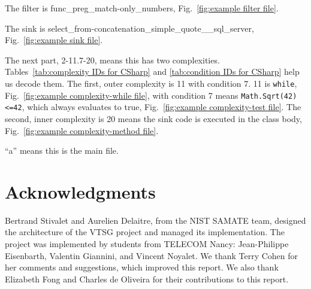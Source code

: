 \documentclass[12pt]{article}
\begin{document}
\noindent The filter is func\_preg\_match-only\_numbers,
Fig.~\ref{fig:example filter file}.

\noindent The sink is select\_from-concatenation\_simple\_quote\_\_sql\_server,
Fig.~\ref{fig:example sink file}.

\noindent The next part, 2-11.7-20, means this has two complexities.
Tables~\ref{tab:complexity IDs for CSharp} and
\ref{tab:condition IDs for CSharp} help us decode them.
The first, outer complexity is 11 with condition 7. 11 is \verb|while|,
Fig.~\ref{fig:example complexity-while file}, 
with condition 7 means \verb|Math.Sqrt(42)<=42|, which always evaluates to true,
Fig.~\ref{fig:example complexity-test file}.
The second, inner complexity is 20 means the sink code is executed in the class body,
Fig.~\ref{fig:example complexity-method file}.

\noindent ``a'' means this is the main file.



\section{Acknowledgments}

Bertrand Stivalet and Aurelien Delaitre, from the NIST SAMATE team, designed the
architecture of the VTSG project and managed its implementation.  The project was
implemented by students from TELECOM Nancy: Jean-Philippe Eisenbarth, Valentin
Giannini, and Vincent Noyalet.  We thank Terry Cohen for her comments and
suggestions, which improved this report.  We also thank Elizabeth Fong and
Charles de Oliveira for their contributions to this report.
%
%
%
%
\end{document}

